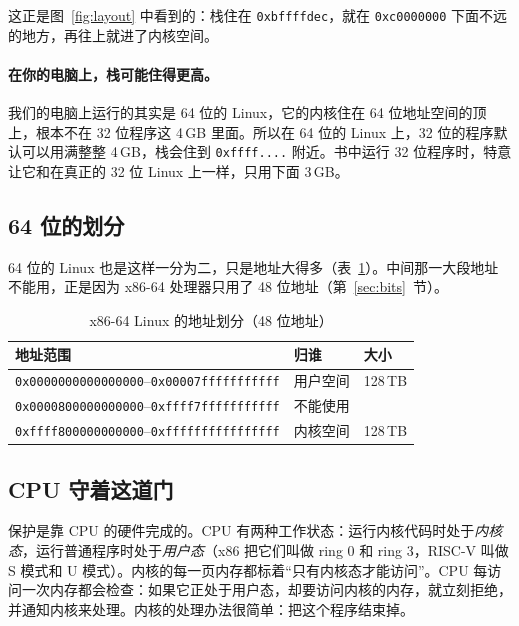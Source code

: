 这正是图~\ref{fig:layout} 中看到的：栈住在 \texttt{0xbffffdec}，就在 \texttt{0xc0000000} 下面不远的地方，再往上就进了内核空间。

\paragraph{在你的电脑上，栈可能住得更高。}
我们的电脑上运行的其实是 64 位的 Linux，它的内核住在 64 位地址空间的顶上，根本不在 32 位程序这 4\,GB 里面。所以在 64 位的 Linux 上，32 位的程序默认可以用满整整 4\,GB，栈会住到 \texttt{0xffff....} 附近。书中运行 32 位程序时，特意让它和在真正的 32 位 Linux 上一样，只用下面 3\,GB。

\subsection{64 位的划分}

64 位的 Linux 也是这样一分为二，只是地址大得多（表~\ref{tab:split}）。中间那一大段地址不能用，正是因为 x86-64 处理器只用了 48 位地址（第~\ref{sec:bits}~节）。

\begin{table}[htbp]
  \centering
  \caption{x86-64 Linux 的地址划分（48 位地址）}
  \label{tab:split}
  \begin{tabular}{lll}
    \toprule
    地址范围 & 归谁 & 大小 \\
    \midrule
    \texttt{0x0000000000000000}--\texttt{0x00007fffffffffff} & 用户空间 & 128\,TB \\
    \texttt{0x0000800000000000}--\texttt{0xffff7fffffffffff} & 不能使用 & \\
    \texttt{0xffff800000000000}--\texttt{0xffffffffffffffff} & 内核空间 & 128\,TB \\
    \bottomrule
  \end{tabular}
\end{table}

\subsection{CPU 守着这道门}

保护是靠 CPU 的硬件完成的。CPU 有两种工作状态：运行内核代码时处于\emph{内核态}，运行普通程序时处于\emph{用户态}（x86 把它们叫做 ring 0 和 ring 3，RISC-V 叫做 S 模式和 U 模式）。内核的每一页内存都标着“只有内核态才能访问”。CPU 每访问一次内存都会检查：如果它正处于用户态，却要访问内核的内存，就立刻拒绝，并通知内核来处理。内核的处理办法很简单：把这个程序结束掉。

